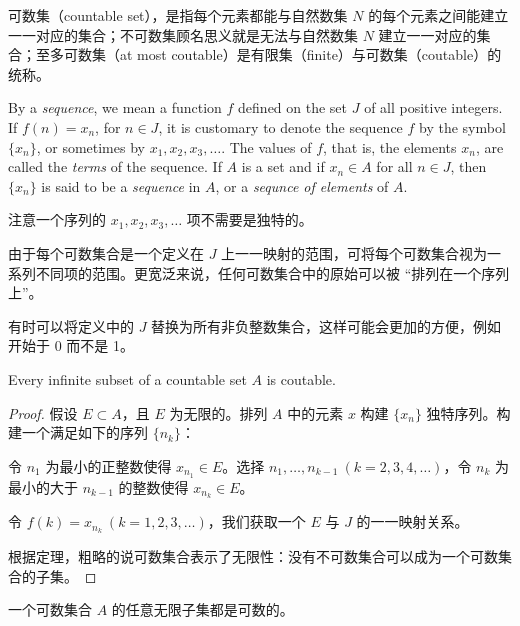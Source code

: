\documentclass[../poma-notes.tex]{subfiles}
\begin{document}
\anote
可数集（countable set），是指每个元素都能与自然数集 $N$ 的每个元素之间能建立一一对应的集合；不可数集顾名思义就是无法与自然数集
$N$ 建立一一对应的集合；至多可数集（at most coutable）是有限集（finite）与可数集（coutable）的统称。

\setcounter{poma}{6}

\begin{definition}
  By a \textit{sequence}, we mean a function $f$ defined on the set $J$ of all positive integers. If $f(n)=x_n$,
  for $n \in J$, it is customary to denote the sequence $f$ by the symbol $\{x_n\}$, or sometimes by $x_1,x_2,x_3,\dots$.
  The values of $f$, that is, the elements $x_n$, are called the \textit{terms} of the sequence. If $A$ is a set and
  if $x_n \in A$ for all $n \in J$, then $\{x_n\}$ is said to be a \textit{sequence} in $A$, or a \textit{sequnce of elements}
  of $A$.
\end{definition}

注意一个序列的 $x_1,x_2,x_3,\dots$ 项不需要是独特的。

由于每个可数集合是一个定义在 $J$ 上一一映射的范围，可将每个可数集合视为一系列不同项的范围。更宽泛来说，任何可数集合中的原始可以被
“排列在一个序列上”。

有时可以将定义中的 $J$ 替换为所有非负整数集合，这样可能会更加的方便，例如开始于 0 而不是 1。

\begin{theorem}
  Every infinite subset of a countable set $A$ is coutable.
\end{theorem}

\begin{proof}
  假设 $E \subset A$，且 $E$ 为无限的。排列 $A$ 中的元素 $x$ 构建 $\{x_n\}$ 独特序列。构建一个满足如下的序列 $\{n_k\}$：

  令 $n_1$ 为最小的正整数使得 $x_{n_1} \in E$。选择 $n_1,\dots,n_{k-1} \ (k=2,3,4,\dots)$，令 $n_k$ 为最小的大于 $n_{k-1}$
  的整数使得 $x_{n_k} \in E$。

  令 $f(k)=x_{n_k} \ (k=1,2,3,\dots)$，我们获取一个 $E$ 与 $J$ 的一一映射关系。

  根据定理，粗略的说可数集合表示了无限性：没有不可数集合可以成为一个可数集合的子集。
\end{proof}

\anote
一个可数集合 $A$ 的任意无限子集都是可数的。
\end{document}
